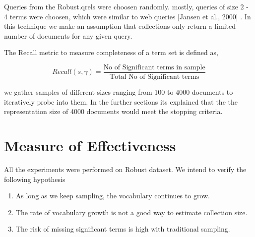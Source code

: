 \documentclass[paper=a4, fontsize=11pt,twoside]{scrartcl}	%
\begin{document}
Queries from the Robust.qrels were choosen randomly. mostly, queries of size 2 - 4 terms were choosen, which were similar to web queries  [Jansen et al., 2000] . In this technique we make an assumption that collections only return a limited number of documents for any given query.

The Recall metric to measure completeness of a term set is defined as,

$$Recall(s,\gamma) = \frac{\text{No of Significant terms in sample}}{\text{Total No of Significant terms}}$$

we gather samples of different sizes ranging from 100 to 4000 documents to iteratively probe into them. In the further sections its explained that the the representation size of 4000 documents would meet the stopping criteria. 




%

\section{Measure of Effectiveness}

All the experiments were performed on Robust dataset. We intend to verify the following hypothesis
\begin{enumerate}
\itemsep -0.5em
\item As long as we keep sampling, the vocabulary continues to grow.
\item The rate of vocabulary growth is not a good way to estimate collection size.
\item The risk of missing significant terms is high with traditional sampling.
\end{enumerate}
\end{document}
